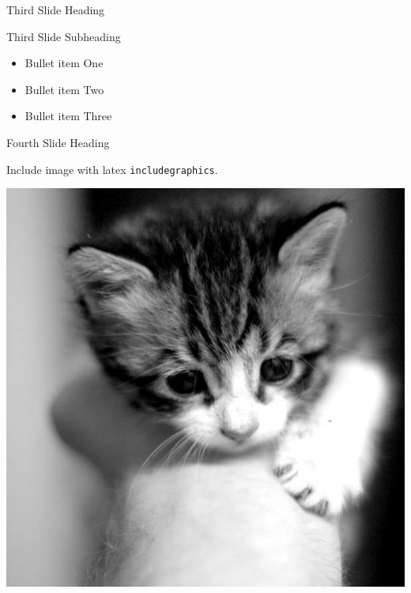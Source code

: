 \begin{frame}{Third Slide Heading}

\begin{block}{Third Slide Subheading}

\begin{itemize}
\itemsep1pt\parskip0pt
\item
  Bullet item One
\item
  Bullet item Two
\item
  Bullet item Three
\end{itemize}

\end{block}

\end{frame}

\begin{frame}{Fourth Slide Heading}

\begin{block}{Include image with latex \texttt{includegraphics}.}

\begin{center}
\includegraphics[width=\textwidth,height=0.8\textheight,keepaspectratio]{600.jpg}
\end{center}

\end{block}

\end{frame}

